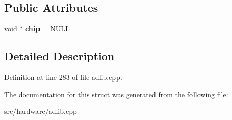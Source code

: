 \subsection*{Public Attributes}
\begin{DoxyCompactItemize}
\item 
\hypertarget{structMAMEOPL3_1_1Handler_a77812ce708e65a61b562062ecfb52ce2}{void $\ast$ {\bfseries chip} = N\-U\-L\-L}\label{structMAMEOPL3_1_1Handler_a77812ce708e65a61b562062ecfb52ce2}

\end{DoxyCompactItemize}


\subsection{Detailed Description}


Definition at line 283 of file adlib.\-cpp.



The documentation for this struct was generated from the following file\-:\begin{DoxyCompactItemize}
\item 
src/hardware/adlib.\-cpp\end{DoxyCompactItemize}
